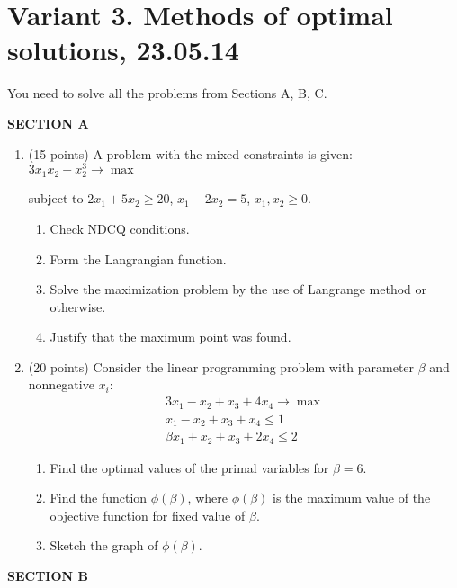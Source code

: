 \documentclass[12pt,a4paper]{article}
\begin{document}
\newpage

\section*{Variant 3. Methods of optimal solutions, 23.05.14}

You need to solve all the problems from Sections A, B, C.

\pagestyle{empty}

\textbf{SECTION A}

\begin{enumerate}
\item (15 points) A problem with the mixed constraints is given: $3x_1 x_2-x_2^3 \to \max$

subject to $2x_1+5x_2 \geq 20$, $x_1-2x_2=5$, $x_1, x_2 \geq 0$.
\begin{enumerate}
\item Check NDCQ conditions.
\item  Form the Langrangian function.
\item Solve the maximization problem by the use of Langrange method or otherwise.
\item Justify that the maximum point was found.
\end{enumerate}
\item  (20 points)   Consider the linear programming problem with parameter $\beta$ and nonnegative $x_i$:
\begin{align*}
3x_1-x_2+x_3+4x_4 \to \max \\
x_1-x_2+x_3+x_4\leq 1 \\
\beta x_1+x_2+x_3+2x_4 \leq 2
\end{align*}

\begin{enumerate}
\item Find the optimal values of the primal variables for $\beta=6$.
\item Find the function $\phi(\beta)$, where $\phi(\beta)$  is the maximum value of the objective function for fixed value of $\beta$.
\item Sketch the graph of $\phi(\beta)$.
\end{enumerate}


\end{enumerate}

\textbf{SECTION B}
\end{document}
